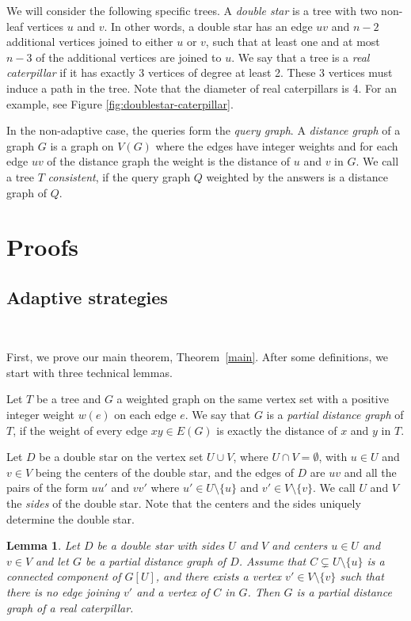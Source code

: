 \documentclass[12pt,a4paper]{amsart}
\theoremstyle{plain}
\newtheorem{lemma}[theorem]{Lemma}
\theoremstyle{definition}
\begin{document}
We will consider the following specific trees. A \textit{double star} is a tree with two non-leaf vertices $u$ and $v$. In other words, a double star has an edge $uv$ and $n-2$ additional vertices joined to either $u$ or $v$, such that at least one and at most $n-3$ of the additional vertices are joined to $u$. We say that a tree is a \textit{real caterpillar} if it has exactly 3 vertices of degree at least 2. These 3 vertices must induce a path in the tree. Note that the diameter of real caterpillars is 4. For an example, see Figure \ref{fig:doublestar-caterpillar}.

In the non-adaptive case, the queries form the \textit{query graph}. A \textit{distance graph} of a graph $G$ is a graph on $V(G)$ where the edges have integer weights and for each edge $uv$ of the distance graph the weight is the distance of $u$ and $v$ in $G$. We call a tree $T$ \emph{consistent}, if the query graph $Q$ weighted by the answers is a distance graph of $Q$.


\section{Proofs} 

\subsection{Adaptive strategies} \

First, we prove our main theorem, Theorem~\ref{main}. After some definitions, we start with three technical lemmas.

Let $T$ be a tree and $G$ a weighted graph on the same vertex set with a positive integer weight $w(e)$ on each edge $e$. We say that $G$ is a \textit{partial distance graph} of $T$, if the weight of every edge $xy \in E(G)$ is exactly the distance of $x$ and $y$ in $T$.

Let $D$ be a double star on the vertex set $U \cup V$, where $U \cap V=\emptyset$, with $u \in U$ and $v \in V$ being the centers of the double star, and the edges of $D$ are $uv$ and all the pairs of the form $uu'$ and $vv'$ where $u' \in U \setminus \{u\}$ and $v' \in V \setminus \{v\}$. We call $U$ and $V$ the \emph{sides} of the double star. Note that the centers and the sides uniquely determine the double star.

\begin{lemma}\label{pdg2}
    Let $D$ be a double star with sides $U$ and $V$ and centers $u \in U$ and $v \in V$ and let $G$ be a partial distance graph of $D$. Assume that $C \subsetneq U \setminus \{u\}$ is a connected component of $G[U]$, and there exists a vertex $v' \in V \setminus \{v\}$ such that there is no edge joining $v'$ and a vertex of $C$ in $G$. Then $G$ is a partial distance graph of a real caterpillar.
\end{lemma}
\end{document}

